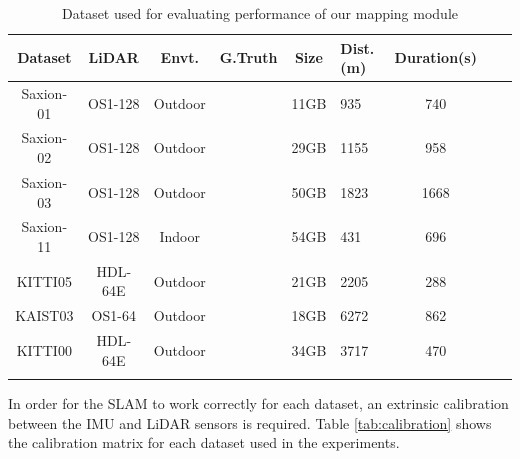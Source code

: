 \begin{table}[H]
	\centering
		\caption{Dataset used for evaluating performance of our mapping module}
	\begin{tabular}{ccccclclc}
		\toprule
		Dataset 	& 	LiDAR 	 		& Envt. 	& G.Truth		& Size &Dist.(m) & Duration(s)\\
		\midrule
		Saxion-01 	& OS1-128 			& Outdoor	& \xmark		& 11GB &935			&740	\\
		Saxion-02 	& OS1-128 			& Outdoor	& \xmark		& 29GB &1155 		&958	 \\
		Saxion-03 	& OS1-128 			& Outdoor	& \xmark		& 50GB &1823 		&1668	 \\
		Saxion-11 	& OS1-128 			& Indoor	& \xmark		& 54GB &431			&696	 \\
		KITTI05 	& HDL-64E 			& Outdoor	& \cmark		& 21GB &2205 		&288	 \\
		KAIST03 	& OS1-64 			& Outdoor	& \cmark		& 18GB &6272 		&862	 \\
		KITTI00 	& HDL-64E 			& Outdoor	& \cmark		& 34GB &3717 		&470	 \\

		\bottomrule& & 
	\end{tabular}
	\label{tab:datasets}
\end{table}
In order for the SLAM to work correctly for each dataset, an extrinsic calibration between the IMU and LiDAR sensors is required. Table \ref{tab:calibration} shows the calibration matrix for each dataset used in the experiments.

